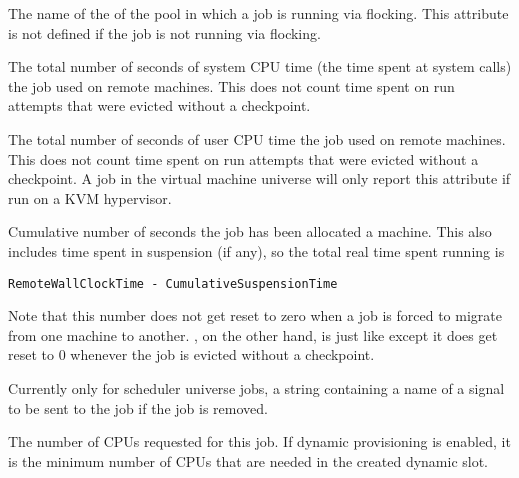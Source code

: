 \begin{description}
\item[\AdAttr{RemotePool}:]  The name of the  of the pool 
in which a job is running via flocking.  
This attribute is not defined if the job is not running via flocking.

\item[\AdAttr{RemoteSysCpu}:]  The total number of seconds
of system CPU time (the time spent at system calls) the job used
on remote machines.  This does not count time spent on run attempts that
were evicted without a checkpoint.

\item[\AdAttr{RemoteUserCpu}:]  The total number of seconds
of user CPU time the job used on remote machines.  This does not
count time spent on run attempts that were evicted without a checkpoint.
A job in the virtual machine universe will only report this attribute if run
on a KVM hypervisor.

\label{RemoteWallClockTime}
\item[\AdAttr{RemoteWallClockTime}:]  Cumulative number of seconds
the job has been allocated a machine.
This also includes time spent in suspension (if any),
so the total real time spent running is 
\begin{verbatim}
RemoteWallClockTime - CumulativeSuspensionTime
\end{verbatim}
Note that this number does not get reset to
zero when a job is forced to migrate from one machine to another.
, on the other hand, is just like
 except it does get reset to 0 whenever
the job is evicted without a checkpoint.

\item[\AdAttr{RemoveKillSig}:]    Currently only for scheduler universe jobs,
a string containing a name of
a signal to be sent to the job if the job is removed.

\item[\AdAttr{RequestCpus}:]  The number of CPUs requested for this job.
If dynamic  provisioning is enabled,
it is the minimum number of CPUs that are needed in the created dynamic slot.


\end{description}

